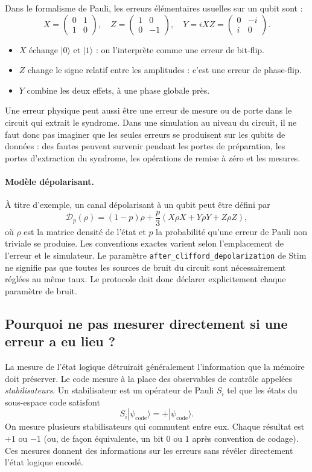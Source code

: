 \documentclass[11pt,a4paper]{article}
\begin{document}
Dans le formalisme de Pauli, les erreurs élémentaires usuelles sur un qubit
sont :
\[
 X=\begin{pmatrix}0&1\\1&0\end{pmatrix},\quad
 Z=\begin{pmatrix}1&0\\0&-1\end{pmatrix},\quad
 Y=iXZ=\begin{pmatrix}0&-i\\i&0\end{pmatrix}.
\]
\begin{itemize}
  \item $X$ échange $|0\rangle$ et $|1\rangle$ : on l'interprète comme une
  erreur de bit-flip.
  \item $Z$ change le signe relatif entre les amplitudes : c'est une erreur
  de phase-flip.
  \item $Y$ combine les deux effets, à une phase globale près.
\end{itemize}
Une erreur physique peut aussi être une erreur de mesure ou de porte dans
le circuit qui extrait le syndrome. Dans une simulation au niveau du circuit,
il ne faut donc pas imaginer que les seules erreurs se produisent sur les
qubits de données : des fautes peuvent survenir pendant les portes de
préparation, les portes d'extraction du syndrome, les opérations de remise
à zéro et les mesures.

\paragraph{Modèle dépolarisant.}
À titre d'exemple, un canal dépolarisant à un qubit peut être défini par
\[
 \mathcal D_p(\rho)=(1-p)\rho+
 \frac p3(X\rho X+Y\rho Y+Z\rho Z),
\]
où $\rho$ est la matrice densité de l'état et $p$ la probabilité qu'une
erreur de Pauli non triviale se produise. Les conventions exactes varient
selon l'emplacement de l'erreur et le simulateur. Le paramètre
\texttt{after\_clifford\_depolarization} de Stim ne signifie pas que toutes
les sources de bruit du circuit sont nécessairement réglées au même taux.
Le protocole doit donc déclarer explicitement chaque paramètre de bruit.

\subsection{Pourquoi ne pas mesurer directement si une erreur a eu lieu ?}

La mesure de l'état logique détruirait généralement l'information que la
mémoire doit préserver. Le code mesure à la place des observables de contrôle
appelées \emph{stabilisateurs}. Un stabilisateur est un opérateur de Pauli
$S_i$ tel que les états du sous-espace code satisfont
\[
 S_i|\psi_{\mathrm{code}}\rangle=+|\psi_{\mathrm{code}}\rangle.
\]
On mesure plusieurs stabilisateurs qui commutent entre eux. Chaque résultat
est $+1$ ou $-1$ (ou, de façon équivalente, un bit $0$ ou $1$ après
convention de codage). Ces mesures donnent des informations sur les erreurs
sans révéler directement l'état logique encodé.
\end{document}

